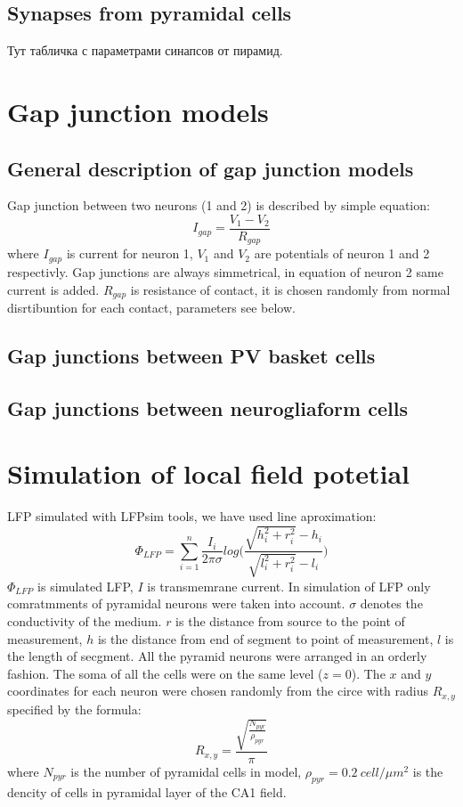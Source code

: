 \documentclass[a4paper,12pt]{article}
\begin{document}
\subsection{Synapses from pyramidal cells}
Тут табличка с параметрами синапсов от пирамид.

\section{Gap junction models} \label{gap_junctions_models}
\subsection{General description of gap junction models}
Gap junction between two neurons (1 and 2) is described by simple equation:
\begin{equation}
I_{gap} = \frac{V_{1} - V_{2}}{R_{gap}}
\end{equation}
where $I_{gap}$ is current for neuron 1, $V_{1}$ and $V_{2}$ are potentials of neuron 1 and 2 respectivly. Gap junctions are always simmetrical, in equation of neuron 2 same current is added. $R_{gap}$ is resistance of contact, it is chosen randomly from normal disrtibuntion for each contact, parameters see below.


\subsection{Gap junctions between PV basket cells}

\subsection{Gap junctions between neurogliaform cells}



\section{Simulation of local field potetial} \label{field_potetial_model}
LFP simulated with LFPsim tools, we have used line aproximation:
\begin{equation} 
\Phi_{LFP} = \sum^{n}_{i=1}{ \frac{I_i}{2\pi \sigma}log \Big(\frac{\sqrt{h_i^2 + r_i^2}-h_i}{\sqrt{l_i^2 + r_i^2}-l_i} } \Big)
\end{equation}
$\Phi_{LFP}$ is simulated LFP, $I$ is transmemrane current.
In simulation of LFP only comratmments of pyramidal neurons were taken into account. $\sigma$ denotes
the conductivity of the medium. $r$ is the distance from
source to the point of measurement, $h$ is the distance from end of segment to point of measurement, $l$ is the length of secgment. All the pyramid neurons were arranged in an orderly fashion. The soma of all the cells were on the same level ($z=0$). The $x$ and $y$ coordinates for each neuron were chosen randomly from the circe with radius $R_{x, y}$ specified by the formula:
\begin{equation} 
R_{x, y} = \frac{\sqrt{\frac{N_{pyr}}{\rho_{pyr}} }} {\pi}
\end{equation}
where $N_{pyr}$ is the number of pyramidal cells in model, $\rho_{pyr} = 0.2 \ cell/\mu m^2$ is the dencity of cells in pyramidal layer of the CA1 field.
\end{document}
